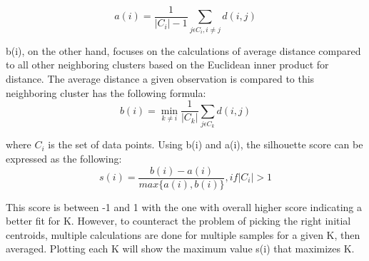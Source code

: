 \documentclass[12pt]{article}
\begin{document}
\begin{equation}
a(i)=\frac{1}{|C_i|-1}\sum_{j\epsilon C_i, i\neq j}d(i,j) 
\end{equation}

b(i), on the other hand, focuses on the calculations of average distance compared to all other neighboring clusters based on the Euclidean inner product for distance.  The average distance a given observation is compared to this neighboring cluster has the following formula: 
\begin{equation}
b(i)=\min_{k\neq i}\frac{1}{|C_k|}\sum_{j\epsilon C_k}d(i,j)
\end{equation}

where $C_i$ is the set of data points. Using b(i) and a(i), the silhouette score can be expressed as the following:
\begin{equation}
s(i)=\frac{b(i)-a(i)}{max\{a(i),b(i)\}}, if |C_i|>1
\end{equation}

This score is between -1 and 1 with the one with overall higher score indicating a better fit for K. However, to counteract the problem of picking the right initial centroids, multiple calculations are done for multiple samples for a given K, then averaged. Plotting each K will show the maximum value s(i) that maximizes K.
\end{document}
